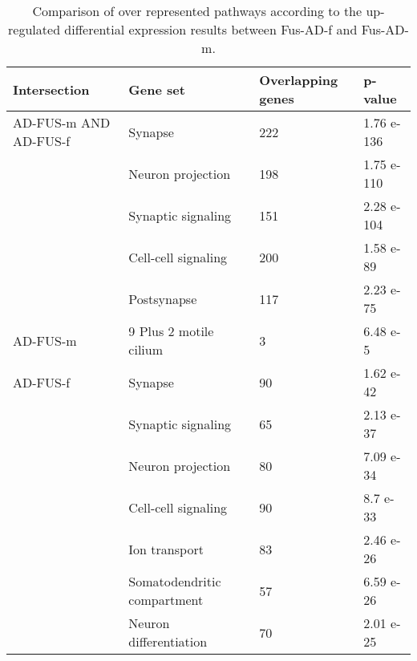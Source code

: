 \begin{table}[!ht]
\centering
\caption{Comparison of over represented pathways according to the up-regulated differential expression results between Fus-AD-f and Fus-AD-m.}
\begin{tabularx}{11cm}{L{2cm}L{2.5cm}L{3cm}C{1.5cm}}
\toprule
\textbf{Intersection} & \textbf{Gene set} & \textbf{Overlapping genes} & \textbf{p-value} \\
\midrule
AD-FUS-m AND AD-FUS-f & Synapse                     & 222 & 1.76 e-136 \\
                      & Neuron projection           & 198 & 1.75 e-110 \\
                      & Synaptic signaling          & 151 & 2.28 e-104 \\
                      & Cell-cell signaling         & 200 & 1.58 e-89  \\
                      & Postsynapse                 & 117 & 2.23 e-75  \\
AD-FUS-m              & 9 Plus 2 motile cilium      & 3   & 6.48 e-5   \\
AD-FUS-f              & Synapse                     & 90  & 1.62 e-42  \\
                      & Synaptic signaling          & 65  & 2.13 e-37  \\
                      & Neuron projection           & 80  & 7.09 e-34  \\
                      & Cell-cell signaling         & 90  & 8.7 e-33   \\
                      & Ion transport               & 83  & 2.46 e-26  \\
                      & Somatodendritic compartment & 57  & 6.59 e-26  \\
                      & Neuron differentiation      & 70  & 2.01 e-25  \\
\bottomrule

\end{tabularx}
\end{table}


